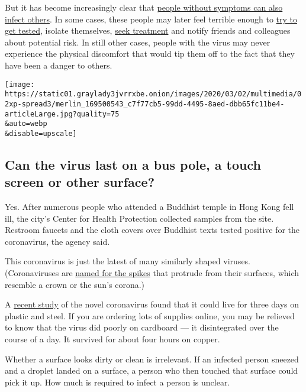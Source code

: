 But it has become increasingly clear that
\href{https://www.nytimes3xbfgragh.onion/2020/02/26/health/coronavirus-asymptomatic.html}{people
without symptoms can also infect others}. In some cases, these people
may later feel terrible enough to
\href{https://www.nytimes3xbfgragh.onion/2020/03/18/nyregion/coronavirus-testing-positive.html}{try
to get tested}, isolate themselves,
\href{https://www.nytimes3xbfgragh.onion/2020/03/17/science/coronavirus-treatment.html}{seek
treatment} and notify friends and colleagues about potential risk. In
still other cases, people with the virus may never experience the
physical discomfort that would tip them off to the fact that they have
been a danger to others.

\texttt{[image: https://static01.graylady3jvrrxbe.onion/images/2020/03/02/multimedia/02xp-spread3/merlin\_169500543\_c7f77cb5-99dd-4495-8aed-dbb65fc11be4-articleLarge.jpg?quality=75\\\&auto=webp\\\&disable=upscale]}

\hypertarget{can-the-virus-last-on-a-bus-pole-a-touch-screen-or-other-surface}{%
\subsection{Can the virus last on a bus pole, a touch screen or other
surface?}\label{can-the-virus-last-on-a-bus-pole-a-touch-screen-or-other-surface}}

Yes. After numerous people who attended a Buddhist temple in Hong Kong
fell ill, the city's Center for Health Protection collected samples from
the site. Restroom faucets and the cloth covers over Buddhist texts
tested positive for the coronavirus, the agency said.

This coronavirus is just the latest of many similarly shaped viruses.
(Coronaviruses are
\href{https://www.nytimes3xbfgragh.onion/article/what-is-coronavirus.html}{named
for the spikes} that protrude from their surfaces, which resemble a
crown or the sun's corona.)

A
\href{https://www.nytimes3xbfgragh.onion/2020/03/17/health/coronavirus-surfaces-aerosols.html}{recent
study} of the novel coronavirus found that it could live for three days
on plastic and steel. If you are ordering lots of supplies online, you
may be relieved to know that the virus did poorly on cardboard --- it
disintegrated over the course of a day. It survived for about four hours
on copper.

Whether a surface looks dirty or clean is irrelevant. If an infected
person sneezed and a droplet landed on a surface, a person who then
touched that surface could pick it up. How much is required to infect a
person is unclear.

